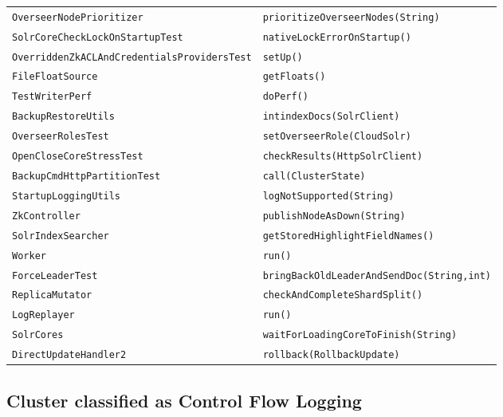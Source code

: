 \begin{center}
\begin{longtable}{ll}
\lstinline/OverseerNodePrioritizer/&{\lstinline/prioritizeOverseerNodes(String)/}\\
\lstinline/SolrCoreCheckLockOnStartupTest/&{\lstinline/nativeLockErrorOnStartup()/}\\
\lstinline/OverriddenZkACLAndCredentialsProvidersTest/&{\lstinline/setUp()/}\\
\lstinline/FileFloatSource/&{\lstinline/getFloats()/}\\
\lstinline/TestWriterPerf/&{\lstinline/doPerf()/}\\
\lstinline/BackupRestoreUtils/&{\lstinline/intindexDocs(SolrClient)/}\\
\lstinline/OverseerRolesTest/&{\lstinline/setOverseerRole(CloudSolr)/}\\
\lstinline/OpenCloseCoreStressTest/&{\lstinline/checkResults(HttpSolrClient)/}\\
\lstinline/BackupCmdHttpPartitionTest/&{\lstinline/call(ClusterState)/}\\
\lstinline/StartupLoggingUtils/&{\lstinline/logNotSupported(String)/}\\
\lstinline/ZkController/&{\lstinline/publishNodeAsDown(String)/}\\
\lstinline/SolrIndexSearcher/&{\lstinline/getStoredHighlightFieldNames()/}\\
\lstinline/Worker/&{\lstinline/run()/}\\
\lstinline/ForceLeaderTest/&{\lstinline/bringBackOldLeaderAndSendDoc(String,int)/}\\
\lstinline/ReplicaMutator/&{\lstinline/checkAndCompleteShardSplit()/}\\
\lstinline/LogReplayer/&{\lstinline/run()/}\\
\lstinline/SolrCores/&{\lstinline/waitForLoadingCoreToFinish(String)/}\\
\lstinline/DirectUpdateHandler2/&{\lstinline/rollback(RollbackUpdate)/}\\

\end{longtable}
\end{center}

\subsection{Cluster classified as Control Flow Logging}

